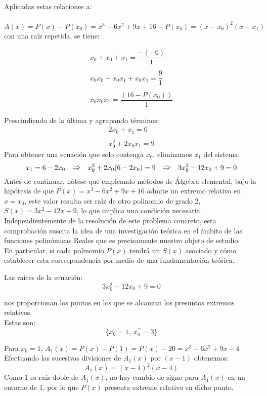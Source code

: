 \documentclass[12pt]{article}
\begin{document}
Aplicadas estas relaciones a: \\ \\
$A(x)=P(x)-P({x}_0)=x^3-6x^2+9x+16-P({x}_0)=(x-{x_0})^2(x-{x}_1)$ con una raíz repetida, se tiene:

\clearpage

$$
  \begin{array}{l}
    {x}_0 + {x}_0 + {x}_1 = \dfrac{-(-6)}{1}            \\
    \\
    {x}_0{x}_0 + {x}_0{x}_1 + {x}_0{x}_1 = \dfrac{9}{1} \\
    \\
    {x}_0{x}_0{x}_1 = \dfrac{(16-P({x}_0))}{1}
  \end{array}
$$

Prescindiendo de la última y agrupando términos:
$$
  \begin{array}{c}
    2{x}_0 + {x}_1 = 6 \\
    \\
    {x}_0^2 + 2{x}_0{x}_1 = 9
  \end{array}
$$
Para obtener una ecuación que solo contenga ${x}_0$, eliminamos ${x}_1$ del sistema:
$$
  {x}_1 = 6 - 2{x}_0
  \ \ \ \text{\large$\Rightarrow$} \ \ \
  {x}_0^2 + 2{x}_0(6-2{x}_0) = 9
  \ \ \ \text{\large$\Rightarrow$} \ \ \
  3{x}_0^2 - 12{x}_0 + 9 = 0
$$
Antes de continuar, nótese que empleando métodos de Álgebra elemental, bajo la hipótesis de que $ P(x) = x^3-6x^2+9x+16 $ admite un extremo relativo en $ x = {x}_0 $, este valor resulta ser raíz de otro polinomio de grado 2, $S(x)=3x^2-12x+9$, lo que implica una condición necesaria. \\
Independientemente de la resolución de este problema concreto, esta comprobación suscita la idea de una investigación teórica en el ámbito de las funciones polinómicas Reales que es precisamente nuestro objeto de estudio. \\
En particular, si cada polinomio $P(x)$ tendrá un $S(x)$ asociado y cómo establecer esta correspondencia por medio de una fundamentación teórica.

Las raíces de la ecuación:
$$
  3{x}_0^2 - 12{x}_0 + 9 = 0
$$

nos proporcionan los puntos en los que se alcanzan los presuntos extremos relativos. \\
Estas son:
$$
  \{{x}_0^{\prime} = 1, \ {x}_0^{\prime\prime} = 3\}
$$

Para ${x}_0 = 1$, ${A}_1(x) = P(x) - P(1) = P(x) - 20 = x^3 - 6x^2 + 9x - 4$ \\
Efectuando las sucesivas divisiones de ${A}_1(x)$ por $(x-1)$ obtenemos:
$$
  {A}_1(x) = (x-1)^2(x-4)
$$
Como 1 es raíz doble de ${A}_1(x)$, no hay cambio de signo para ${A}_1(x)$ en un entorno de 1, por lo que $P(x)$ presenta extremo relativo en dicho punto.
\clearpage
\end{document}
